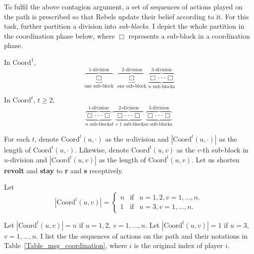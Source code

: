 \documentclass[12pt,letter]{article}
\newcommand{\Kappa}{\mathrm{Coord}}
\theoremstyle{definition}
\theoremstyle{remark}
\theoremstyle{claim}
\begin{document}
To fulfil the above contagion argument, a set of sequences of actions played on the path is prescribed so that Rebels update their belief according to it. For this task, further partition a division into \textit{sub-blocks}. I depict the whole partition in the coordination phase below, where $\Box$ represents a sub-block in a coordination phase. 

In $\Kappa^1$, 
\[\overbrace{\underbrace{ \Box }_{\text{one sub-block}}}^{\text{$1$-division}} \overbrace{\underbrace{\Box }_{\text{one sub-block}}}^{\text{$2$-division}} \overbrace{\underbrace{\Box \cdot \cdot \cdot \Box}_{\text{$n$ sub-blocks}}}^{\text{$3$-division}}\] 

In $\Kappa^t$, $t\geq 2$,
\[\overbrace{\underbrace{\Box \cdot \cdot \cdot \Box}_{\text{$n$ sub-blocks}}}^{\text{$1$-division}} \overbrace{\underbrace{\Box \cdot \cdot \cdot \Box}_{\text{$t+1$ sub-blocks}} }^{\text{$2$-division}} \overbrace{\underbrace{\Box \cdot \cdot \cdot \Box}_{\text{$n$ sub-blocks}}}^{\text{$3$-division}}\] 




For each $t$, denote $\Kappa^t(u,\cdot)$ as the $u$-division and $|\Kappa^t(u,\cdot) |$ as the length of $\Kappa^t(u,\cdot)$. Likewise, denote $\Kappa^t(u,v)$ as the $v$-th sub-block in $u$-division and $|\Kappa^t(u,v) |$ as the length of $\Kappa^t(u,v)$. Let us shorten \textbf{revolt} and \textbf{stay} to \textbf{r} and \textbf{s} receptively. 

Let
\[
    |\Kappa^t(u,v)|=\left\{
                \begin{array}{lcl}
                  n & \text{if} & u=1,2, v=1,...,n.\\
                 1 & \text{if} & u=3, v=1,...,n.
                \end{array}
              \right. 
\]


Let $|\Kappa^t(u,v)|=n$ if $u=1,2$, $v=1,...,n$. Let $|\Kappa^t(u,v)|=1$ if $u=3$, $v=1,...,n$. I list the the sequences of actions on the path and their notations in Table~\ref{Table_msg_coordination}, where $i$ is the original index of player $i$.
\end{document}

